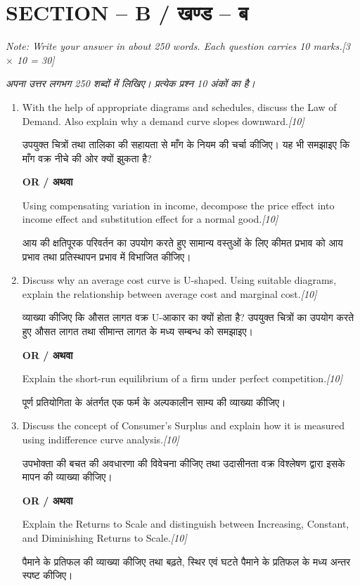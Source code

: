 \documentclass[11pt,a4paper]{article}
\newcommand{\pts}[1]{\hfill \textit{[#1]}}
\begin{document}
\section*{SECTION -- B / खण्ड -- ब}
\noindent \textit{Note: Write your answer in about 250 words. Each question carries 10 marks.}\pts{3 $\times$ 10 = 30}

\noindent \textit{अपना उत्तर लगभग 250 शब्दों में लिखिए। प्रत्येक प्रश्न 10 अंकों का है।}

\begin{enumerate}[label=\textbf{\arabic*.},leftmargin=*,start=2,itemsep=12pt]

  \item With the help of appropriate diagrams and schedules, discuss the Law of Demand. Also explain why a demand curve slopes downward.\pts{10}
  
  उपयुक्त चित्रों तथा तालिका की सहायता से माँग के नियम की चर्चा कीजिए। यह भी समझाइए कि माँग वक्र नीचे की ओर क्यों झुकता है?

  \begin{center}\textbf{OR / अथवा}\end{center}

  Using compensating variation in income, decompose the price effect into income effect and substitution effect for a normal good.\pts{10}
  
  आय की क्षतिपूरक परिवर्तन का उपयोग करते हुए सामान्य वस्तुओं के लिए कीमत प्रभाव को आय प्रभाव तथा प्रतिस्थापन प्रभाव में विभाजित कीजिए।

  \item Discuss why an average cost curve is U-shaped. Using suitable diagrams, explain the relationship between average cost and marginal cost.\pts{10}
  
  व्याख्या कीजिए कि औसत लागत वक्र U-आकार का क्यों होता है? उपयुक्त चित्रों का उपयोग करते हुए औसत लागत तथा सीमान्त लागत के मध्य सम्बन्ध को समझाइए।

  \begin{center}\textbf{OR / अथवा}\end{center}

  Explain the short-run equilibrium of a firm under perfect competition.\pts{10}
  
  पूर्ण प्रतियोगिता के अंतर्गत एक फर्म के अल्पकालीन साम्य की व्याख्या कीजिए।

  \item Discuss the concept of Consumer's Surplus and explain how it is measured using indifference curve analysis.\pts{10}
  
  उपभोक्ता की बचत की अवधारणा की विवेचना कीजिए तथा उदासीनता वक्र विश्लेषण द्वारा इसके मापन की व्याख्या कीजिए।

  \begin{center}\textbf{OR / अथवा}\end{center}

  Explain the Returns to Scale and distinguish between Increasing, Constant, and Diminishing Returns to Scale.\pts{10}
  
  पैमाने के प्रतिफल की व्याख्या कीजिए तथा बढ़ते, स्थिर एवं घटते पैमाने के प्रतिफल के मध्य अन्तर स्पष्ट कीजिए।

\end{enumerate}
\end{document}
